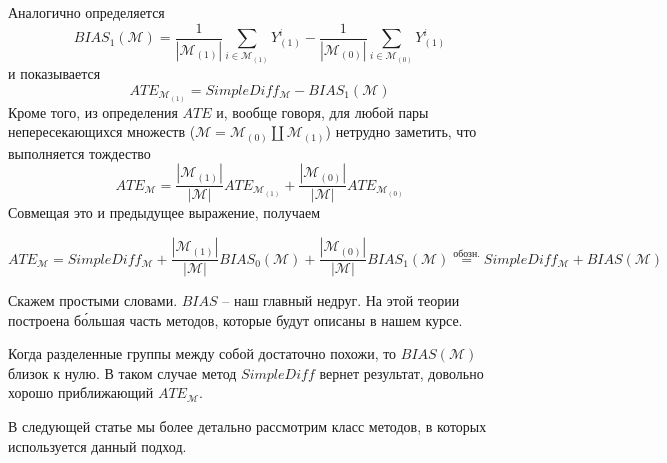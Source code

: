         Аналогично определяется
        \[
            BIAS_1(\mathcal{M}) =
            \frac{1}{|\mathcal{M}_{(1)}|} \displaystyle\sum_{i\in\mathcal{M}_{(1)}}
            Y^i_{(1)} -
            \frac{1}{|\mathcal{M}_{(0)}|} \displaystyle\sum_{i\in\mathcal{M}_{(0)}}
            Y^i_{(1)}
        \]
        и показывается
        \[
            ATE_{\mathcal{M}_{(1)}} = SimpleDiff_\mathcal{M} - BIAS_1(\mathcal{M})
        \]
        Кроме того, из определения $ATE$ и, вообще говоря, для любой пары непересекающихся множеств ($\mathcal{M} = \mathcal{M}_{(0)} \amalg \mathcal{M}_{(1)}$) нетрудно заметить, что выполняется тождество
        \[
            ATE_\mathcal{M} =
            \frac{|\mathcal{M}_{(1)}|}{|\mathcal{M}|} ATE_{\mathcal{M}_{(1)} }+
            \frac{|\mathcal{M}_{(0)}|}{|\mathcal{M}|} ATE_{\mathcal{M}_{(0)}}
        \]
        Совмещая это и предыдущее выражение, получаем

        \[
            ATE_\mathcal{M} =
            SimpleDiff_\mathcal{M} +
            \frac{|\mathcal{M}_{(1)}|}{|\mathcal{M}|} BIAS_0(\mathcal{M}) +
            \frac{|\mathcal{M}_{(0)}|}{|\mathcal{M}|} BIAS_1(\mathcal{M})
            \stackrel{\text{обозн.}}{=}
            SimpleDiff_\mathcal{M} +
            BIAS(\mathcal{M})
        \]

        Скажем простыми словами.
        $BIAS$ -- наш главный недруг.
        На этой теории построена б\'{о}льшая часть методов, которые будут описаны в нашем курсе.

        Когда разделенные группы между собой достаточно похожи, то $BIAS(\mathcal{M})$ близок к нулю.
        В таком случае метод $SimpleDiff$ вернет результат, довольно хорошо приближающий $ATE_\mathcal{M}$.

        В следующей статье мы более детально рассмотрим класс методов, в которых используется данный подход.
